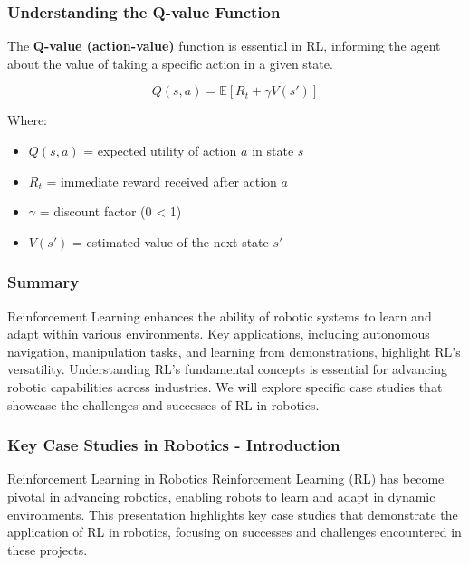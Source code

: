 \documentclass[aspectratio=169]{beamer}
\begin{document}
\begin{frame}[fragile]
    \frametitle{Understanding the Q-value Function}
    The \textbf{Q-value (action-value)} function is essential in RL, informing the agent about the value of taking a specific action in a given state.

    \begin{equation}
        Q(s, a) = \mathbb{E}[R_t + \gamma V(s')]
    \end{equation}

    Where:
    \begin{itemize}
        \item \( Q(s, a) \) = expected utility of action \( a \) in state \( s \)
        \item \( R_t \) = immediate reward received after action \( a \)
        \item \( \gamma \) = discount factor (0 \leq \gamma < 1)
        \item \( V(s') \) = estimated value of the next state \( s' \)
    \end{itemize}
\end{frame}

\begin{frame}[fragile]
    \frametitle{Summary}
    Reinforcement Learning enhances the ability of robotic systems to learn and adapt within various environments. Key applications, including autonomous navigation, manipulation tasks, and learning from demonstrations, highlight RL's versatility. Understanding RL’s fundamental concepts is essential for advancing robotic capabilities across industries. We will explore specific case studies that showcase the challenges and successes of RL in robotics.
\end{frame}

\begin{frame}[fragile]
    \frametitle{Key Case Studies in Robotics - Introduction}
    \begin{block}{Reinforcement Learning in Robotics}
        Reinforcement Learning (RL) has become pivotal in advancing robotics, enabling robots to learn and adapt in dynamic environments. This presentation highlights key case studies that demonstrate the application of RL in robotics, focusing on successes and challenges encountered in these projects.
    \end{block}
\end{frame}
\end{document}
